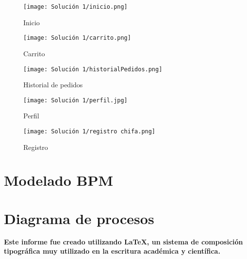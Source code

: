 \documentclass{article}
\begin{document}
\begin{doublespace}
    \begin{figure}[H]
        \centering
        \vspace*{1cm}
        \texttt{[image: Solución 1/inicio.png]}
        \caption{Inicio}
        \label{fig:Inicio}
    \end{figure}
    \begin{figure}[H]
        \centering
        \vspace*{1cm}
        \texttt{[image: Solución 1/carrito.png]}
        \caption{Carrito}
        \label{fig:Carrito}
    \end{figure}
    \begin{figure}[H]
        \centering
        \vspace*{1cm}
        \texttt{[image: Solución 1/historialPedidos.png]}
        \caption{Historial de pedidos}
        \label{fig:Historial-Pedidos}
    \end{figure}
    \begin{figure}[H]
        \centering
        \vspace*{1cm}
        \texttt{[image: Solución 1/perfil.jpg]}
        \caption{Perfil}
        \label{fig:Perfil}
    \end{figure}
    \begin{figure}[H]
        \centering
        \vspace*{1cm}
        \texttt{[image: Solución 1/registro chifa.png]}
        \caption{Registro}
        \label{fig:Registro}
    \end{figure}

    \section{Modelado BPM}
    \begin{itemize}
        
    \end{itemize}

    \section{Diagrama de procesos}
    \begin{itemize}
        
    \end{itemize}

    \begin{center}
        \textbf{Este informe fue creado utilizando \LaTeX, un sistema de composición tipográfica muy utilizado en la escritura académica y científica.}
    \end{center}

\end{doublespace}
\end{document}
